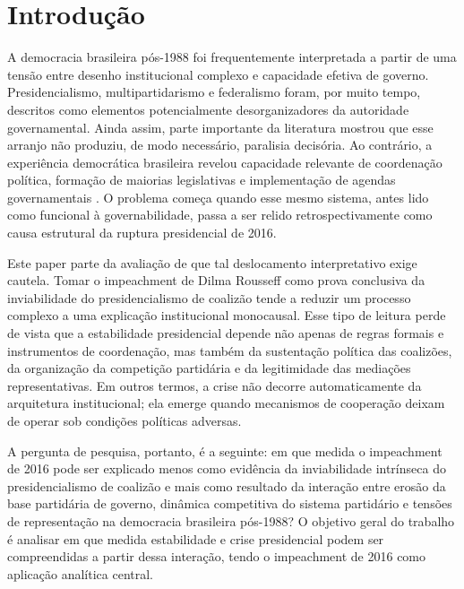 \documentclass[12pt,a4paper]{article}
\begin{document}
\section{Introdução}
\label{sec:orga5ead32}
A democracia brasileira pós-1988 foi frequentemente interpretada a partir de uma tensão entre desenho institucional complexo e capacidade efetiva de governo. Presidencialismo, multipartidarismo e federalismo foram, por muito tempo, descritos como elementos potencialmente desorganizadores da autoridade governamental. Ainda assim, parte importante da literatura mostrou que esse arranjo não produziu, de modo necessário, paralisia decisória. Ao contrário, a experiência democrática brasileira revelou capacidade relevante de coordenação política, formação de maiorias legislativas e implementação de agendas governamentais \textcite{palermo2000_como_se} \textcite{limongi2017_a_crise}. O problema começa quando esse mesmo sistema, antes lido como funcional à governabilidade, passa a ser relido retrospectivamente como causa estrutural da ruptura presidencial de 2016.

Este paper parte da avaliação de que tal deslocamento interpretativo exige cautela. Tomar o impeachment de Dilma Rousseff como prova conclusiva da inviabilidade do presidencialismo de coalizão tende a reduzir um processo complexo a uma explicação institucional monocausal. Esse tipo de leitura perde de vista que a estabilidade presidencial depende não apenas de regras formais e instrumentos de coordenação, mas também da sustentação política das coalizões, da organização da competição partidária e da legitimidade das mediações representativas. Em outros termos, a crise não decorre automaticamente da arquitetura institucional; ela emerge quando mecanismos de cooperação deixam de operar sob condições políticas adversas.

A pergunta de pesquisa, portanto, é a seguinte: em que medida o impeachment de 2016 pode ser explicado menos como evidência da inviabilidade intrínseca do presidencialismo de coalizão e mais como resultado da interação entre erosão da base partidária de governo, dinâmica competitiva do sistema partidário e tensões de representação na democracia brasileira pós-1988? O objetivo geral do trabalho é analisar em que medida estabilidade e crise presidencial podem ser compreendidas a partir dessa interação, tendo o impeachment de 2016 como aplicação analítica central.
\end{document}

